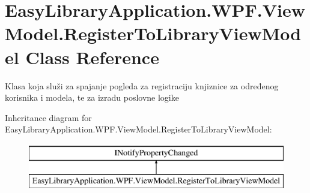 \hypertarget{class_easy_library_application_1_1_w_p_f_1_1_view_model_1_1_register_to_library_view_model}{}\section{Easy\+Library\+Application.\+W\+P\+F.\+View\+Model.\+Register\+To\+Library\+View\+Model Class Reference}
\label{class_easy_library_application_1_1_w_p_f_1_1_view_model_1_1_register_to_library_view_model}


Klasa koja služi za spajanje pogleda za registraciju knjiznice za određenog korisnika i modela, te za izradu poslovne logike  


Inheritance diagram for Easy\+Library\+Application.\+W\+P\+F.\+View\+Model.\+Register\+To\+Library\+View\+Model\+:\begin{figure}[H]
\begin{center}
\leavevmode
\includegraphics[height=2.000000cm]{class_easy_library_application_1_1_w_p_f_1_1_view_model_1_1_register_to_library_view_model}
\end{center}
\end{figure}
